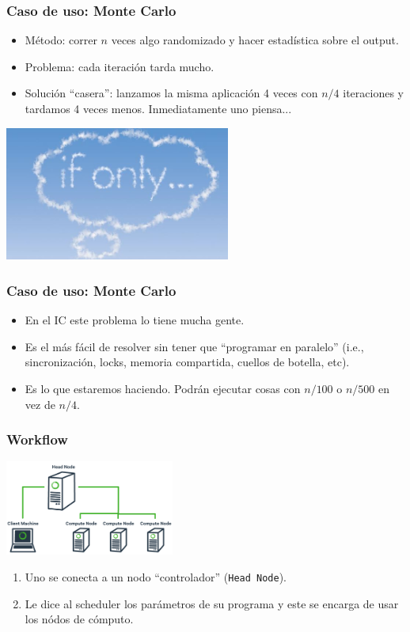 \documentclass[handout]{beamer}
\begin{document}
\begin{frame}
\frametitle{Caso de uso: Monte Carlo}
\begin{itemize}
  \item<+-> Método: correr $n$ veces algo randomizado y hacer estadística sobre el output.
  \item<+-> Problema: cada iteración tarda mucho.
  \item<+-> Solución ``casera'': lanzamos la misma aplicación 4 veces con $n/4$ iteraciones y tardamos 4 veces menos. Inmediatamente uno piensa...
\end{itemize}
\onslide<+->
\begin{center}
\includegraphics[width=20em]{ifonly.jpg}
\end{center}
\end{frame}

\begin{frame}
\frametitle{Caso de uso: Monte Carlo}
\begin{itemize}
  \item En el IC este problema lo tiene mucha gente.
  \item Es el más fácil de resolver sin tener que ``programar en paralelo'' (i.e., sincronización, locks, memoria compartida, cuellos de botella, etc).
  \item Es lo que estaremos haciendo. Podrán ejecutar cosas con $n/100$ o $n/500$ en vez de $n/4$. 
\end{itemize}
\end{frame}


\begin{frame}
\frametitle{Workflow}
\begin{center}
\includegraphics[width=15em]{cluster_diagram.png}
\end{center}
\begin{enumerate}
  \item Uno se conecta a un nodo ``controlador'' (\Verb=Head Node=).
  \item Le dice al scheduler los parámetros de su programa y este se encarga de usar los nódos de cómputo.
\end{enumerate}
\end{frame}
\end{document}
